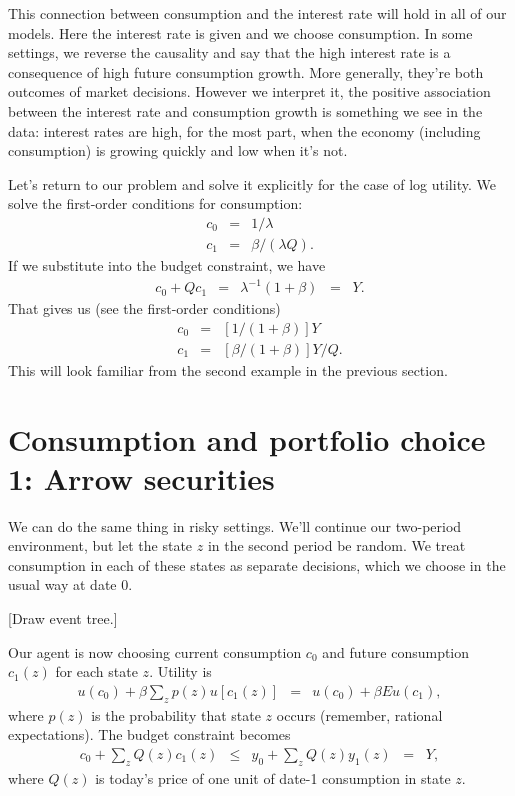 This connection between consumption and the interest rate
will hold in all of our models.
Here the interest rate is given and we choose consumption.
In some settings, we reverse the causality
and say that the high interest rate is a consequence
of high future consumption growth.
More generally, they're both outcomes of market decisions.
However we interpret it, the positive association between the interest rate
and consumption growth is something we see in the data:
interest rates are high, for the most part,
when the economy (including consumption) is growing quickly
and low when it's not.


Let's return to our problem and solve it explicitly
for the case of log utility.
We solve the first-order conditions for consumption:
\begin{eqnarray*}
        c_0  &=& 1/\lambda  \\
        c_1  &=& \beta/(\lambda Q) .
\end{eqnarray*}
If we substitute into the budget constraint,
we have
\begin{eqnarray}
    c_0 + Q c_1 &=& \lambda^{-1}
            \left(1 + \beta \right) \;\;=\;\; Y.
\end{eqnarray}
That gives us (see the first-order conditions)
\begin{eqnarray*}
        c_0  &=& [1/(1+\beta)] Y \\
        c_1  &=& [\beta/(1+\beta)] Y / Q  .
\end{eqnarray*}
This will look familiar from the second example in the previous section.



\section{Consumption and portfolio choice 1:  Arrow securities}

We can do the same thing in risky settings.
We'll continue our two-period environment,
but let the state $z$ in the second period be random.
We treat consumption in each of these states
as separate decisions, which we choose in the usual way
at date 0.

[Draw event tree.]

Our agent is now choosing current consumption $c_0$
and future consumption $c_1(z)$ for each state $z$.
Utility is
\begin{eqnarray}
    u(c_0) + \beta \sum_z p(z) u[c_1(z)]
    &=&     u(c_0) + \beta E u(c_1) ,
    \label{eq:utility-2period-stochastic}
\end{eqnarray}
where $p(z)$ is the probability that state $z$ occurs
(remember, rational expectations).
The budget constraint becomes
\begin{eqnarray}
    c_0 + \sum_z Q(z) c_1(z) &\leq& y_0 + \sum_z Q(z) y_1(z) \;\;=\;\; Y ,
    \label{eq:budget-2period-stochastic}
\end{eqnarray}
where $Q(z)$ is today's price of one unit of date-1 consumption in state $z$.


